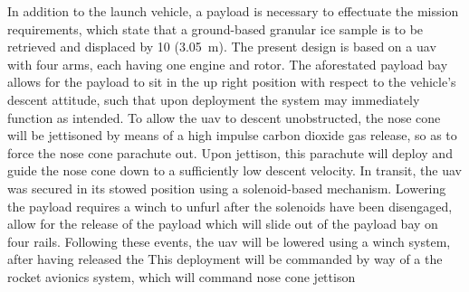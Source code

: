 In addition to the launch vehicle, a payload is necessary to effectuate the mission requirements, which state that a ground-based granular ice sample is to be retrieved and displaced by \SI{10}{\feet} (\SI{3.05}{\meter}). The present design is based on a \gls{uav} with four arms, each having one engine and rotor. The aforestated payload bay allows for the payload to sit in the up right position with respect to the vehicle's descent attitude, such that upon deployment the system may immediately function as intended. To allow the \gls{uav} to descent unobstructed, the nose cone will be jettisoned by means of a high impulse carbon dioxide gas release, so as to force the nose cone parachute out. Upon jettison, this parachute will deploy and guide the nose cone down to a sufficiently low descent velocity. In transit, the \gls{uav} was secured in its stowed position using a solenoid-based mechanism. Lowering the payload requires a winch to unfurl after the solenoids have been disengaged, allow for the release of the payload which will slide out of the payload bay on four rails. Following these events, the \gls{uav} will be lowered using a winch system, after having released the  This deployment will be commanded by way of a the rocket avionics system, which will command nose cone jettison